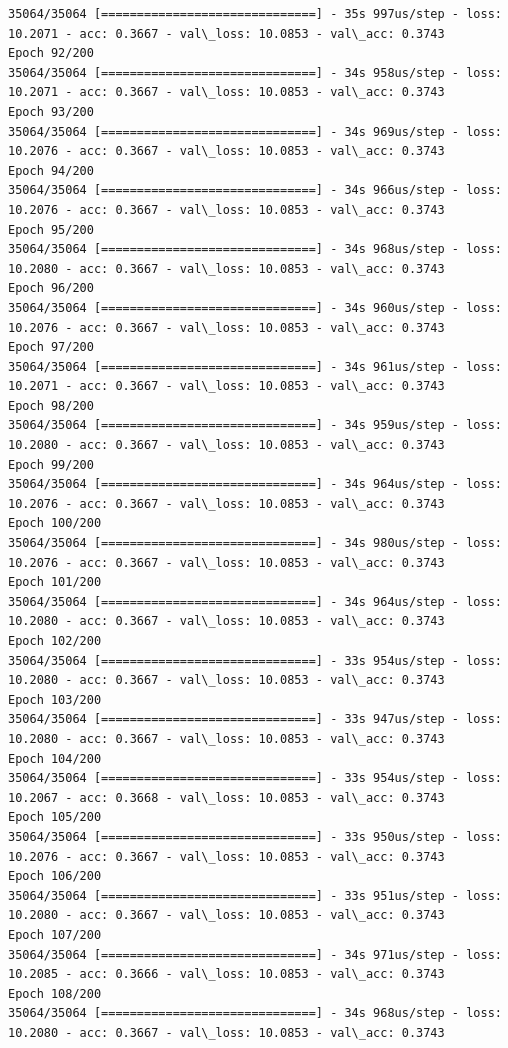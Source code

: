 \documentclass[11pt]{article}
\begin{document}
\begin{Verbatim}[commandchars=\\\{\}]
35064/35064 [==============================] - 35s 997us/step - loss: 10.2071 - acc: 0.3667 - val\_loss: 10.0853 - val\_acc: 0.3743
Epoch 92/200
35064/35064 [==============================] - 34s 958us/step - loss: 10.2071 - acc: 0.3667 - val\_loss: 10.0853 - val\_acc: 0.3743
Epoch 93/200
35064/35064 [==============================] - 34s 969us/step - loss: 10.2076 - acc: 0.3667 - val\_loss: 10.0853 - val\_acc: 0.3743
Epoch 94/200
35064/35064 [==============================] - 34s 966us/step - loss: 10.2076 - acc: 0.3667 - val\_loss: 10.0853 - val\_acc: 0.3743
Epoch 95/200
35064/35064 [==============================] - 34s 968us/step - loss: 10.2080 - acc: 0.3667 - val\_loss: 10.0853 - val\_acc: 0.3743
Epoch 96/200
35064/35064 [==============================] - 34s 960us/step - loss: 10.2076 - acc: 0.3667 - val\_loss: 10.0853 - val\_acc: 0.3743
Epoch 97/200
35064/35064 [==============================] - 34s 961us/step - loss: 10.2071 - acc: 0.3667 - val\_loss: 10.0853 - val\_acc: 0.3743
Epoch 98/200
35064/35064 [==============================] - 34s 959us/step - loss: 10.2080 - acc: 0.3667 - val\_loss: 10.0853 - val\_acc: 0.3743
Epoch 99/200
35064/35064 [==============================] - 34s 964us/step - loss: 10.2076 - acc: 0.3667 - val\_loss: 10.0853 - val\_acc: 0.3743
Epoch 100/200
35064/35064 [==============================] - 34s 980us/step - loss: 10.2076 - acc: 0.3667 - val\_loss: 10.0853 - val\_acc: 0.3743
Epoch 101/200
35064/35064 [==============================] - 34s 964us/step - loss: 10.2080 - acc: 0.3667 - val\_loss: 10.0853 - val\_acc: 0.3743
Epoch 102/200
35064/35064 [==============================] - 33s 954us/step - loss: 10.2080 - acc: 0.3667 - val\_loss: 10.0853 - val\_acc: 0.3743
Epoch 103/200
35064/35064 [==============================] - 33s 947us/step - loss: 10.2080 - acc: 0.3667 - val\_loss: 10.0853 - val\_acc: 0.3743
Epoch 104/200
35064/35064 [==============================] - 33s 954us/step - loss: 10.2067 - acc: 0.3668 - val\_loss: 10.0853 - val\_acc: 0.3743
Epoch 105/200
35064/35064 [==============================] - 33s 950us/step - loss: 10.2076 - acc: 0.3667 - val\_loss: 10.0853 - val\_acc: 0.3743
Epoch 106/200
35064/35064 [==============================] - 33s 951us/step - loss: 10.2080 - acc: 0.3667 - val\_loss: 10.0853 - val\_acc: 0.3743
Epoch 107/200
35064/35064 [==============================] - 34s 971us/step - loss: 10.2085 - acc: 0.3666 - val\_loss: 10.0853 - val\_acc: 0.3743
Epoch 108/200
35064/35064 [==============================] - 34s 968us/step - loss: 10.2080 - acc: 0.3667 - val\_loss: 10.0853 - val\_acc: 0.3743

\end{Verbatim}
\end{document}
